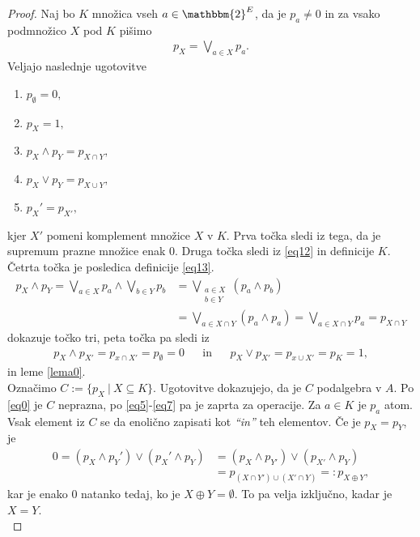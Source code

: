 \documentclass{amsart}
\begin{document}
\begin{proof}
    \noindent Naj bo $K$ množica vseh \(a \in \mathbbm{2}^{E}\), da je \(p_a \neq 0\) in za vsako
    podmnožico $X$ pod $K$ pišimo 
    \begin{align}
        \label{eq13}
        p_X = \bigvee_{a\in X}p_a.
    \end{align}
    Veljajo naslednje ugotovitve
    \begin{enumerate}
        \item $p_\emptyset = 0,$
        \item $p_X = 1,$
        \item $p_X \wedge p_Y = p_{X\cap Y},$
        \item $p_X \vee p_Y = p_{X\cup Y},$
        \item $p_X' = p_{X'},$
    \end{enumerate}
    kjer $X'$ pomeni komplement množice $X$ v $K$. Prva točka sledi iz tega, da je
    supremum prazne množice enak $0$. Druga točka sledi iz \eqref{eq12} in definicije $K$.
    Četrta točka je posledica definicije \eqref{eq13}.
    \begin{align*}
        p_X \wedge p_Y = \bigvee_{a\in X}p_a \wedge \bigvee_{b\in Y}p_b &= 
        \bigvee_{\substack{a\in X \\ b\in Y}} (p_a\wedge p_b)\\
        &= \bigvee_{a\in X \cap Y} (p_a\wedge p_a) = \bigvee_{a\in X \cap Y} p_a = p_{X\cap Y}
    \end{align*}
    dokazuje točko tri, peta točka pa sledi iz
    \begin{align*}
        p_X\wedge p_{X'} = p_{x\cap X'} = p_\emptyset = 0 && \text{in}&& p_X\vee p_{X'} = p_{x\cup X'} = p_K = 1,
    \end{align*}
    in leme \ref*{lema0}.\\

    \noindent Označimo \(C := \{p_X ~|~ X \subseteq K\}\). Ugotovitve dokazujejo, da je $C$ podalgebra
    v $A$. Po \eqref{eq0} je $C$ neprazna, po \eqref{eq5}-\eqref{eq7} pa je 
    zaprta za operacije. Za $a \in K$ je $p_a$ atom. Vsak element iz $C$ se 
    da enolično zapisati kot \textit{``in''} teh elementov. Če je $p_X = p_Y$, je
    \begin{align*}
        0 =(p_X \wedge p_Y') \vee (p_X' \wedge p_Y) &= (p_X \wedge p_{Y'}) 
        \vee (p_{X'} \wedge p_Y)
        \\&= p_{(X \cap Y') \cup (X' \cap Y)} =: p_{X \oplus Y},
    \end{align*}
    kar je enako $0$ natanko tedaj, ko je $X \oplus Y = \emptyset$. To pa velja izključno,
    kadar je $X = Y$.\\


\end{proof}
\end{document}
